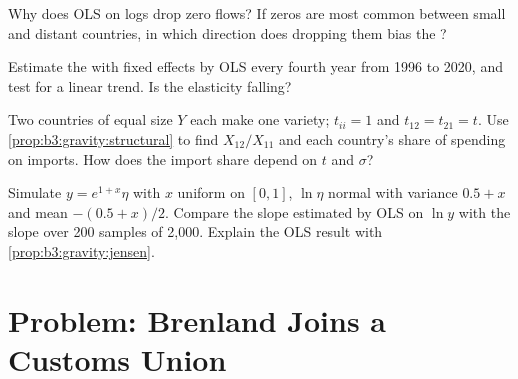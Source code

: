 \begin{exercise}[$\star\star$]\label{exo:b3:gravity:9}
Why does OLS on logs drop zero flows? If zeros are most common between small and
distant countries, in which direction does dropping them bias the ?
\end{exercise}

\begin{exercise}[$\star\star\star$]\label{exo:b3:gravity:10}
Estimate the  with fixed effects by OLS every fourth year from
1996 to 2020, and test for a linear trend. Is the elasticity falling?
\end{exercise}

\begin{exercise}[$\star\star\star$]\label{exo:b3:gravity:11}
Two countries of equal size $Y$ each make one variety; $t_{ii} = 1$ and $t_{12} = t_{21} =
t$. Use \cref{prop:b3:gravity:structural} to find $X_{12}/X_{11}$ and each country's
share of spending on imports. How does the import share depend on $t$ and $\sigma$?
\end{exercise}

\begin{exercise}[$\star\star\star$]\label{exo:b3:gravity:12}
Simulate $y = e^{1 + x}\eta$ with $x$ uniform on $[0, 1]$, $\ln\eta$ normal with variance $0.5 + x$
and mean $-(0.5 + x)/2$. Compare the slope estimated by OLS on $\ln y$ with the 
slope over 200 samples of 2{,}000. Explain the OLS result with
\cref{prop:b3:gravity:jensen}.
\end{exercise}

\section{Problem: Brenland Joins a Customs Union}\label{sec:b3:gravity:problem}

